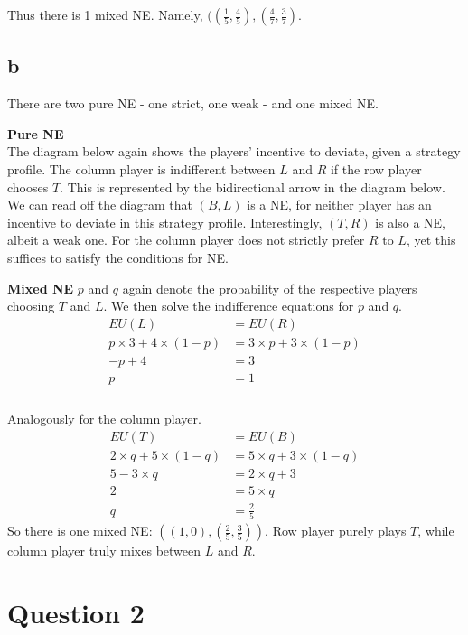 \documentclass[10pt,a4paper]{article}
\begin{document}
Thus there is 1 mixed NE. Namely, $((\tfrac{1}{5},\tfrac{4}{5}),(\tfrac{4}{7},\tfrac{3}{7})$.
\subsection*{b}
There are two pure NE - one strict, one weak - and one mixed NE.

\textbf{Pure NE}\\
The diagram below again shows the players' incentive to deviate, given a strategy profile.
The column player is indifferent between $L$ and $R$ if the row player chooses $T$. This is represented by the bidirectional arrow in the diagram below. We can read off the diagram that $(B,L)$ is a NE, for neither player has an incentive to deviate in this strategy profile. Interestingly, $(T,R)$ is also a NE, albeit a weak one. For the column player does not strictly prefer $R$ to $L$, yet this suffices to satisfy the conditions for NE.

\textbf{Mixed NE}
$p$ and $q$ again denote the probability of the respective players choosing $T$ and $L$. We then solve the indifference equations for $p$ and $q$.
\begin{align*}
EU(L)&=EU(R)\\
p\times 3 + 4\times (1-p)&= 3\times p + 3\times (1-p) \\
-p + 4 &= 3 \\
p &= 1 \\
\end{align*}\\
Analogously for the column player.\\
\begin{align*}
EU(T)&=EU(B)\\
2\times q + 5\times (1-q)&= 5\times q + 3\times (1-q) \\
5 - 3\times q &= 2\times q +3 \\
2 &= 5\times q \\
q &= \tfrac{2}{5}
\end{align*}
So there is one mixed NE: $((1,0),(\tfrac{2}{5},\tfrac{3}{5}))$. Row player purely plays $T$, while column player truly mixes between $L$ and $R$.
\section*{Question 2}
\end{document}
